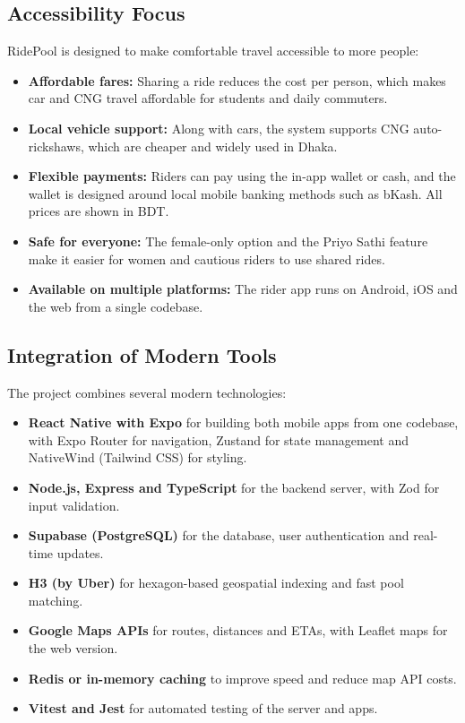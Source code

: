 \subsection{Accessibility Focus}

RidePool is designed to make comfortable travel accessible to more people:

\begin{itemize}
  \item \textbf{Affordable fares:} Sharing a ride reduces the cost per person,
        which makes car and CNG travel affordable for students and daily
        commuters.
  \item \textbf{Local vehicle support:} Along with cars, the system supports
        CNG auto-rickshaws, which are cheaper and widely used in Dhaka.
  \item \textbf{Flexible payments:} Riders can pay using the in-app wallet or
        cash, and the wallet is designed around local mobile banking methods
        such as bKash. All prices are shown in BDT.
  \item \textbf{Safe for everyone:} The female-only option and the Priyo Sathi
        feature make it easier for women and cautious riders to use shared
        rides.
  \item \textbf{Available on multiple platforms:} The rider app runs on
        Android, iOS and the web from a single codebase.
\end{itemize}

\subsection{Integration of Modern Tools}

The project combines several modern technologies:

\begin{itemize}
  \item \textbf{React Native with Expo} for building both mobile apps from one
        codebase, with Expo Router for navigation, Zustand for state management
        and NativeWind (Tailwind CSS) for styling.
  \item \textbf{Node.js, Express and TypeScript} for the backend server, with
        Zod for input validation.
  \item \textbf{Supabase (PostgreSQL)} for the database, user authentication
        and real-time updates.
  \item \textbf{H3 (by Uber)} for hexagon-based geospatial indexing and fast
        pool matching.
  \item \textbf{Google Maps APIs} for routes, distances and ETAs, with Leaflet
        maps for the web version.
  \item \textbf{Redis or in-memory caching} to improve speed and reduce map API
        costs.
  \item \textbf{Vitest and Jest} for automated testing of the server and apps.
\end{itemize}

